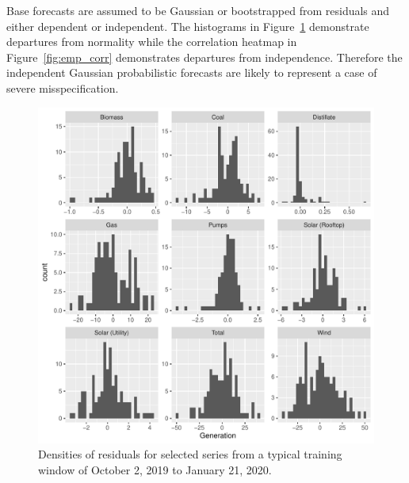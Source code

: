 \documentclass[12pt]{article}
\theoremstyle{definition}
\begin{document}
Base forecasts are assumed to be Gaussian or bootstrapped from residuals and either dependent or independent.  The histograms in Figure~\ref{fig:emp_hist} demonstrate departures from normality while the correlation heatmap in Figure~\ref{fig:emp_corr} demonstrates departures from independence.  Therefore the independent Gaussian probabilistic forecasts are likely to represent a case of severe misspecification.

\begin{figure}[H]
	\centering
	\includegraphics[width=.8\textwidth]{Figs/densities.pdf}
	\caption{Densities of residuals for selected series from a typical training window of October 2, 2019 to January 21, 2020.}
	\label{fig:emp_hist}
\end{figure}	
\end{document}
